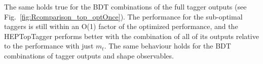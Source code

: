 The same holds true for the BDT combinations of the full tagger outputs (see Fig.~\ref{fig:Rcomparison_top_optOnce}). The performance for the sub-optimal taggers is still within an O(1) factor of the optimized performance, and the HEPTopTagger performs better with the combination of all of its outputs relative to the performance with just $m_t$. The same behaviour holds for the BDT combinations of tagger outputs and shape observables. \\


\begin{figure}
\begin{center}

\end{center}
\end{figure}
